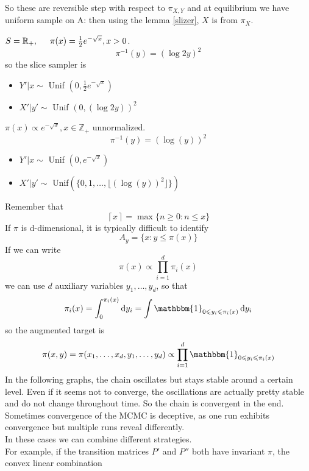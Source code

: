 \documentclass{article}
\begin{document}
	So these are reversible step with respect to $\pi_{X,Y}$ and at equilibrium we have uniform sample on A: then using the lemma \ref{slizer}, $X$ is from $\pi_X$.
	\begin{example}
		
		$S=\mathbb{R}_+, \hspace{0.5 cm} \pi(x)=\frac{1}{2}e^{-\sqrt{x}}, x > 0$.
		\begin{equation*}
			\pi^{-1}(y) = (\log2y)^2
		\end{equation*}
		so the slice sampler is 
		\begin{itemize}
			\item $Y'|x \sim$ Unif $(0,\frac{1}{2}e^{-\sqrt{x}} )$
			\item $X'|y' \sim$ Unif $(0,(\log2y))^2$
		\end{itemize}
		
		$\pi(x) \propto e^{-\sqrt{x}}, x \in \mathbb{Z}_+$ unnormalized.
		\begin{equation*}
			\pi^{-1}(y) = (\log(y))^2
		\end{equation*}
		\begin{itemize}
			\item $Y'|x \sim$ Unif $(0,e^{-\sqrt{x}} )$
			\item $X'|y' \sim$ Unif$(\{0,1,\ldots, \lfloor{(\log(y))^2 \rfloor}\})$ 
		\end{itemize}
		Remember that 
		\begin{equation*}
			\left \lceil{x}\right \rceil =\max \{n \geqslant 0: n \leqslant x\}
		\end{equation*}
		If $\pi$ is d-dimensional, it is typically difficult to identify
		\begin{equation*}
			A_y = \{x: y \leqslant \pi(x)\}
		\end{equation*}
		If we can write 
		\begin{equation*}
			\pi(x) \propto \prod_{i = 1}^d \pi_i(x)
		\end{equation*}
		we can use $d$ auxiliary variables $y_1, \ldots, y_d$, so that 
		\begin{equation*}
			\pi_i(x) = \int_0^{\pi_i(x)}\dif y_i = \int \mathbbm{1}_{0 \leqslant y_i \leqslant \pi_i(x)} \dif y_i
		\end{equation*}
		so the augmented target is 
		\begin{equation*}
			\pi(x,y)=\pi(x_1, \ldots, x_d, y_1, \ldots, y_d) \propto \prod_{i = 1}^d \mathbbm{1}_{0 \leqslant y_i \leqslant \pi_i(x)} 
		\end{equation*}
		In the following graphs, the chain oscillates but stays stable around a certain level. Even if it seems not to converge, the oscillations are actually pretty stable and do not change throughout time. So the chain is convergent in the end.\\
		
		Sometimes convergence of the MCMC is deceptive, as one run exhibits convergence but multiple runs reveal differently. \\
		In these cases we can combine different strategies. \\
		For example, if the transition matrices $P'$ and $P''$ both have invariant $\pi$, the convex linear combination 
	\end{example}
\end{document}
